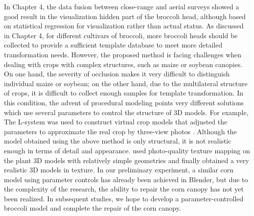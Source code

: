 In Chapter 4, the data fusion between close-range and aerial surveys showed a good result in the visualization hidden part of the broccoli head, although based on statistical regression for visualization rather than actual status. As discussed in Chapter 4, for different cultivars of broccoli, more broccoli heads should be collected to provide a sufficient template database to meet more detailed transformation needs. However, the proposed method is facing challenges when dealing with crops with complex structures, such as maize or soybean canopies. On one hand, the severity of occlusion makes it very difficult to distinguish individual maize or soybean; on the other hand, due to the multilateral structure of crops, it is difficult to collect enough samples for template transformation. In this condition, the advent of procedural modeling points very different solutions which use several parameters to control the structure of 3D models. For example, The L-system was used to construct virtual crop models that adjusted the parameters to approximate the real crop by three-view photos \citep{cieslak_l-system_2021}. Although the model obtained using the above method is only structural, it is not realistic enough in terms of detail and appearance. \citet{mikami_hidden_2022} used photo-quality texture mapping on the plant 3D models with relatively simple geometries and finally obtained a very realistic 3D models in texture. In our preliminary experiment, a similar corn model using parameter controls has already been achieved in Blender, but due to the complexity of the research, the ability to repair the corn canopy has not yet been realized. In subsequent studies, we hope to develop a parameter-controlled broccoli model and complete the repair of the corn canopy.


